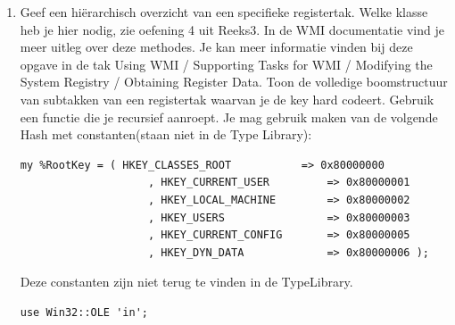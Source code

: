 \documentclass[11pt,a4paper]{report}
\begin{document}
\begin{enumerate}[resume]
\begin{lstlisting}
my $Locator=Win32::OLE->new("WbemScripting.SWbemLocator");
my $WbemServices = $Locator->ConnectServer($ComputerName, $NameSpace);
my $Instance = $WbemServices->Get("$ClassName='$InstanceName'");

printf "%s is currently %s\n" ,$Instance->{DisplayName},$Instance->{State};

my $Methods = $WbemServices->Get($ClassName,wbemFlagUseAmendedQualifiers)->{Methods_};

my %StartServiceReturnValues=maakHash_method_qualifier($Methods->Item("StartService"));
my %StopServiceReturnValues=maakHash_method_qualifier($Methods->Item("StopService"));

if ( $Instance->{State} eq "Stopped" ) {
	#formele methode
	my $OutParameters = $Instance->ExecMethod_("StartService"); #geen invoerparameters
	my $intRC = $OutParameters->{ReturnValue};
	print ($intRC ? "Execution failed: " . $StartServiceReturnValues{$intRC} : $Instance->{DisplayName} . " started") , "\n";
}
else {
	#directe methode
	$intRC=$Instance->StopService();  
	print ($intRC ? "Execution failed: " . $StopServiceReturnValues{$intRC} : $Instance->{DisplayName} . " stopped") , "\n" ;
}

sub maakHash_method_qualifier{
	my $Method=shift;
	my %hash=();
	@hash{@{$Method->Qualifiers_(ValueMap)->{Value}}}
	=@{$Method->Qualifiers_(Values)->{Value}};
	return %hash;
}
	\end{lstlisting}
	\item Geef een hiërarchisch overzicht van een specifieke registertak. Welke klasse heb je hier nodig, zie oefening 4 uit Reeks3.
	In de WMI documentatie vind je meer uitleg over deze methodes. Je kan meer informatie vinden bij deze opgave in de tak Using WMI / Supporting Tasks for WMI / Modifying the System Registry / Obtaining Register Data.
	Toon de volledige boomstructuur van subtakken van een registertak waarvan je de key hard codeert. Gebruik een functie die je recursief aanroept.
	Je mag gebruik maken van de volgende Hash met constanten(staan niet in de Type Library):
	
	\begin{lstlisting}
my %RootKey = ( HKEY_CLASSES_ROOT   		=> 0x80000000
					, HKEY_CURRENT_USER   		=> 0x80000001
					, HKEY_LOCAL_MACHINE  		=> 0x80000002
					, HKEY_USERS         		=> 0x80000003
					, HKEY_CURRENT_CONFIG 		=> 0x80000005
					, HKEY_DYN_DATA       		=> 0x80000006 );
	\end{lstlisting}
	Deze constanten zijn niet terug te vinden in de TypeLibrary.
	\newpage
	\begin{lstlisting}
use Win32::OLE 'in';


\end{lstlisting}
\end{enumerate}
\end{document}
